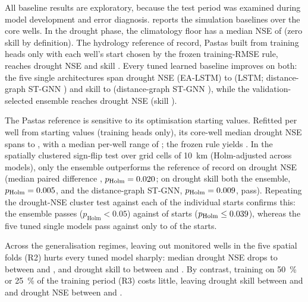 All baseline results are exploratory, because the test period was examined during model development
and error diagnosis.  reports the simulation baselines over the
\nDataCoreWells{} core wells. In the drought phase, the climatology floor has a median NSE of
\baselineClimatologyDroughtNSE{} (zero skill by definition). The hydrology reference of record,
Pastas \citep{Collenteur2019Pastas} built from training heads only with each well's start chosen by
the frozen training-RMSE rule, reaches drought NSE \baselinePastasDroughtNSE{} and skill
\baselinePastasDroughtSkill{}. Every tuned learned baseline improves on both: the five single
architectures span drought NSE \baselineEALSTMDroughtNSE{} (EA-LSTM) to \baselineLSTMDroughtNSE{}
(LSTM; distance-graph ST-GNN \baselineDistanceSTGNNDroughtNSE{}) and skill
\baselineEALSTMDroughtSkill{} to \baselineLSTMDroughtSkill{} (distance-graph ST-GNN
\baselineDistanceSTGNNDroughtSkill{}), while the validation-selected ensemble reaches drought NSE
\baselineEnsembleDroughtNSE{} (skill \baselineEnsembleDroughtSkill{}).

The Pastas reference is sensitive to its optimisation starting values. Refitted per well from
\baselinePastasStarts{} starting values (training heads only), its core-well median drought NSE
spans \baselinePastasStartMinDroughtNSE{} to \baselinePastasStartMaxDroughtNSE{}, with a median
per-well range of \baselinePastasWellRangeMedian{}; the frozen rule yields
\baselinePastasDroughtNSE{}. In the spatially clustered sign-flip test over
\baselineClusterCount{} grid cells of \SI{10}{km} (Holm-adjusted across models), only the ensemble
outperforms the reference of record on drought NSE (median paired difference
\baselineEnsembleDiffDroughtNSE{}, $p_{\mathrm{Holm}} = \num{0.020}$; on
drought skill both the ensemble, $p_{\mathrm{Holm}} = \num{0.005}$, and the
distance-graph ST-GNN, $p_{\mathrm{Holm}} = \num{0.009}$, pass).
Repeating the drought-NSE cluster test against each of the \baselinePastasStarts{} individual
starts confirms this: the ensemble passes ($p_{\mathrm{Holm}} < 0.05$) against
\baselineEnsembleStartsPass{} of \baselinePastasStarts{} starts
($p_{\mathrm{Holm}} \le \num{0.039}$), whereas the five tuned single models
pass against only \baselineSingleStartsPassMin{} to \baselineSingleStartsPassMax{} of the
\baselinePastasStarts{} starts.

Across the generalisation regimes, leaving out monitored wells in the five spatial folds (R2)
hurts every tuned model sharply: median drought NSE drops to between
\baselineRegimeTwoMinDroughtNSE{} and \baselineRegimeTwoMaxDroughtNSE{}, and drought skill to
between \baselineRegimeTwoMinDroughtSkill{} and \baselineRegimeTwoMaxDroughtSkill{}. By contrast,
training on \SI{50}{\percent} or \SI{25}{\percent} of the training period (R3) costs little,
leaving drought skill between \baselineRegimeThreeMinDroughtSkill{} and
\baselineRegimeThreeMaxDroughtSkill{} and drought NSE between \baselineRegimeThreeMinDroughtNSE{}
and \baselineRegimeThreeMaxDroughtNSE{}.

